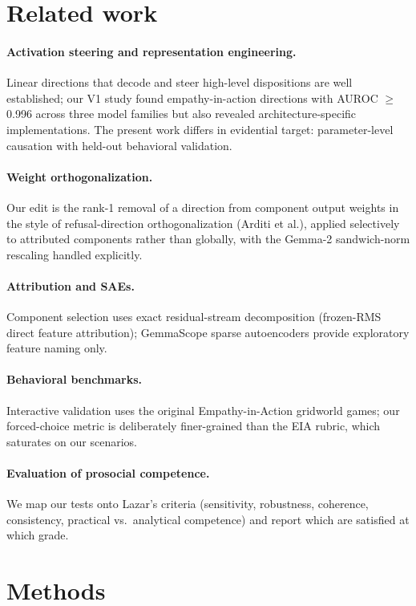 \documentclass{article}
\begin{document}
\section{Related work}
\paragraph{Activation steering and representation engineering.} Linear
directions that decode and steer high-level dispositions are well established;
our V1 study found empathy-in-action directions with AUROC $\ge$0.996 across
three model families but also revealed architecture-specific implementations.
The present work differs in evidential target: parameter-level causation with
held-out behavioral validation.
\paragraph{Weight orthogonalization.} Our edit is the rank-1 removal of a
direction from component output weights in the style of refusal-direction
orthogonalization (Arditi et al.), applied selectively to attributed
components rather than globally, with the Gemma-2 sandwich-norm rescaling
handled explicitly.
\paragraph{Attribution and SAEs.} Component selection uses exact
residual-stream decomposition (frozen-RMS direct feature attribution);
GemmaScope sparse autoencoders provide exploratory feature naming only.
\paragraph{Behavioral benchmarks.} Interactive validation uses the original
Empathy-in-Action gridworld games; our forced-choice metric is deliberately
finer-grained than the EIA rubric, which saturates on our scenarios.
\paragraph{Evaluation of prosocial competence.} We map our tests onto Lazar's
criteria (sensitivity, robustness, coherence, consistency, practical vs.\
analytical competence) and report which are satisfied at which grade.

\section{Methods}
\end{document}
